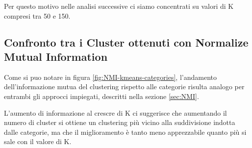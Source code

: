 \documentclass[
	11pt, %
	a4paper, %
	oneside, %
	headinclude,footinclude, %
	BCOR5mm, %
]{scrartcl}
\begin{document}
	Per questo motivo nelle analisi successive ci siamo concentrati su valori di K compresi tra 50 e 150.

	\subsection{Confronto tra i Cluster ottenuti con Normalize Mutual Information}
		Come si puo notare in figura \ref{fig:NMI-kmeans-categories}, l'andamento dell'informazione mutua del clustering rispetto alle categorie risulta analogo per entrambi gli approcci impiegati, descritti nella sezione \ref{sec:NMI}.

		L'aumento di informazione al crescre di K ci suggerisce che aumentando il numero di cluster si ottiene un clustering più vicino alla suddivisione indotta dalle categorie, ma che il miglioramento è tanto meno apprezzabile quanto più si sale con il valore di K.
\end{document}
